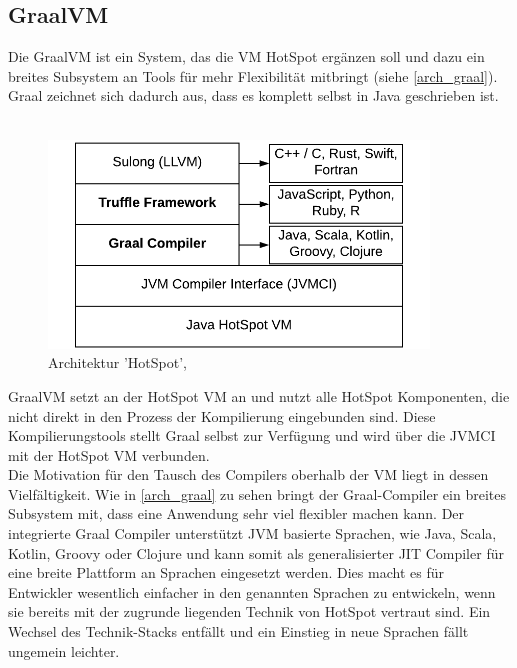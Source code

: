 \subsection{GraalVM}
Die GraalVM ist ein System, das die \ac{VM} HotSpot ergänzen soll und dazu ein breites Subsystem an Tools für mehr Flexibilität mitbringt (siehe \autoref{arch_graal}). Graal zeichnet sich dadurch aus, dass es komplett selbst in Java geschrieben ist. \\
\\
\begin{figure}[ht]
    \begin{center}
        \includegraphics[width=0.9\textwidth]{assets/img/GraalVM-Architecture.png}
        \caption{Architektur 'HotSpot', \cite[Quelle: Sipek 2020]{Sipek_2020}}
        \label{arch_graal}
    \end{center}
\end{figure}
GraalVM setzt an der HotSpot \ac{VM} an und nutzt alle HotSpot Komponenten, die nicht direkt in den Prozess der Kompilierung eingebunden sind. Diese Kompilierungstools stellt Graal selbst zur Verfügung und wird über die \ac{JVMCI} mit der HotSpot \ac{VM} verbunden. \\
Die Motivation für den Tausch des Compilers oberhalb der \ac{VM} liegt in dessen Vielfältigkeit. Wie in \autoref{arch_graal} zu sehen bringt der Graal-Compiler ein breites Subsystem mit, dass eine Anwendung sehr viel flexibler machen kann. Der integrierte Graal Compiler unterstützt \ac{JVM} basierte Sprachen, wie Java, Scala, Kotlin, Groovy oder Clojure und kann somit als generalisierter \ac{JIT} Compiler für eine breite Plattform an Sprachen eingesetzt werden. Dies macht es für Entwickler wesentlich einfacher in den genannten Sprachen zu entwickeln, wenn sie bereits mit der zugrunde liegenden Technik von HotSpot vertraut sind. Ein Wechsel des Technik-Stacks entfällt und ein Einstieg in neue Sprachen fällt ungemein leichter. \\
